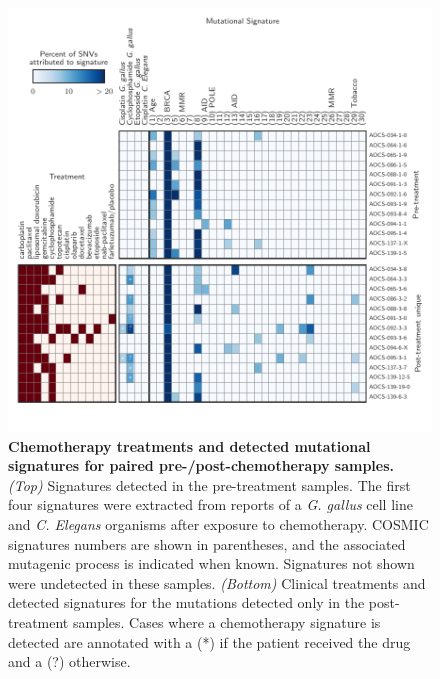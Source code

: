
\begin{figure}[htbp]
\centering
\includegraphics[scale=1.0]{figures/signatures.pdf}
\caption{\textbf{Chemotherapy treatments and detected mutational signatures for paired pre-/post-chemotherapy samples.} \textit{(Top)} Signatures detected in the pre-treatment samples. The first four signatures were extracted from reports of a \textit{G. gallus} cell line and \textit{C. Elegans} organisms after exposure to chemotherapy. COSMIC signatures numbers are shown in parentheses, and the associated mutagenic process is indicated when known. Signatures not shown were undetected in these samples. \textit{(Bottom)} Clinical treatments and detected signatures for the mutations detected only in the post-treatment samples. Cases where a chemotherapy signature is detected are annotated with a (*) if the patient received the drug and a (?) otherwise.}
\label{fig:signatures}
\end{figure}

